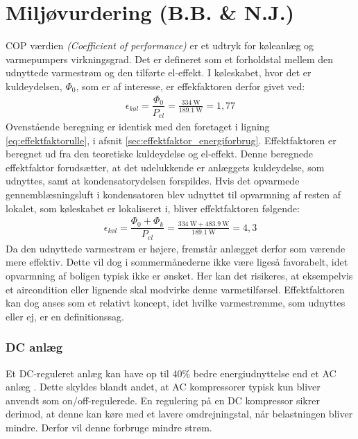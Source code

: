 \documentclass[../Hovedrapport.tex]{subfiles}
\begin{document}
\chapter{Miljøvurdering (B.B. \& N.J.)}
    \label{chap:Opstartsfas}
        \vspace{-30pt}
COP værdien \textit{(Coefficient of performance)} er et udtryk for køleanlæg og varmepumpers virkningsgrad. Det er defineret som et forholdstal mellem den udnyttede varmestrøm og den tilførte el-effekt. I køleskabet, hvor det er kuldeydelsen, $\Phi_0$, som er af interesse, er effekfaktoren derfor givet ved:
    \begin{align}
        \label{eq:}
        \epsilon_{\textit{køl}}= \dfrac{\Phi_0}{P_{el}} = \frac{\SI{334}{\watt}}{\SI{189,1}{\watt}} = 1,77
    \end{align}
Ovenstående beregning er identisk med den foretaget i ligning \ref{eq:effektfaktorulle}, i afsnit \ref{sec:effektfaktor_energiforbrug}. Effektfaktoren er beregnet ud fra den teoretiske kuldeydelse og el-effekt. Denne beregnede effektfaktor forudsætter, at det udelukkende er anlæggets kuldeydelse, som udnyttes, samt at kondensatorydelsen forspildes. Hvis det opvarmede gennemblæsningsluft i kondensatoren blev udnyttet til opvarmning af resten af lokalet, som køleskabet er lokaliseret i, bliver effektfaktoren følgende:
        \begin{align}
        \epsilon_{\textit{køl}}= \dfrac{\Phi_0+\Phi_k}{P_{el}} =  \frac{\SI{334}{\watt}+\SI{483,9}{\watt}}{\SI{189,1}{\watt}} = 4,3
    \end{align}
Da den udnyttede varmestrøm er højere, fremstår anlægget derfor som værende mere effektiv. Dette vil dog i sommermånederne ikke være ligeså favorabelt, idet opvarmning af boligen typisk ikke er ønsket. Her kan det risikeres, at eksempelvis et aircondition eller lignende skal modvirke denne varmetilførsel. Effektfaktoren kan dog anses som et relativt koncept, idet hvilke varmestrømme, som udnyttes eller ej, er en definitionssag.

\subsection*{DC anlæg}
Et DC-reguleret anlæg kan have op til 40\% bedre energiudnyttelse end et AC anlæg \citep{learneng}. Dette skyldes blandt andet, at AC kompressorer typisk kun bliver anvendt som on/off-regulerede. En regulering på en DC kompressor sikrer derimod, at denne kan køre med et lavere omdrejningstal, når belastningen bliver mindre. Derfor vil denne forbruge mindre strøm.
\end{document}
